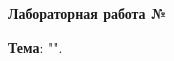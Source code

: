 \documentclass[12pt, a4paper, simple]{eskdtext}
\begin{document}
    \begin{ESKDtitlePage}
        
    \end{ESKDtitlePage}

    \begin{center}
        \textbf{Лабораторная работа №\titlePageLabNumber}\\
    \end{center}

    \textbf{Тема}: "\titlePageTopic".\\

    
\end{document}
